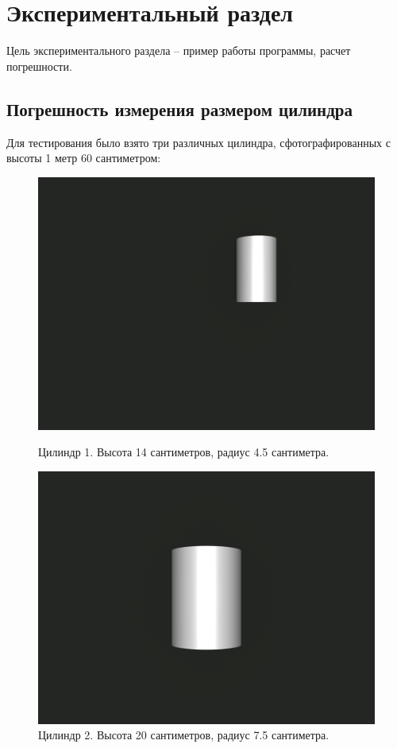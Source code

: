 \chapter{Экспериментальный раздел}
Цель экспериментального раздела – пример работы программы, расчет погрешности.

\section{Погрешность измерения размером цилиндра}
Для тестирования было взято три различных цилиндра, сфотографированных с высоты 1 метр 60 сантиметром:
\begin{figure}[H]
	\centering
	\begin{minipage}{.5\textwidth}
		\centering
		\includegraphics[scale=0.2]{img/16_0045_014.png}
		\caption{Цилиндр 1. Высота 14 сантиметров, радиус 4.5 сантиметра.}
		\label{class:c1}
	\end{minipage}%
	\begin{minipage}{.5\textwidth}
		\centering
		\includegraphics[scale=0.2]{img/16_0075_02.png}
		\caption{Цилиндр 2. Высота 20 сантиметров, радиус 7.5 сантиметра.}
		\label{class:c2}
	\end{minipage}
\end{figure}
